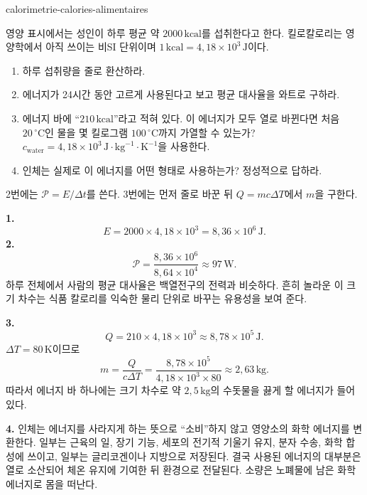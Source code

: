 \begin{exo}{calorimetrie-calories-alimentaires}

영양 표시에서는 성인이 하루 평균 약 $2000\,\text{kcal}$를 섭취한다고 한다. 킬로칼로리는 영양학에서 아직 쓰이는 비SI 단위이며 $1\,\text{kcal}=4{,}18\times10^3\,\text{J}$이다.
\begin{enumerate}
  \item 하루 섭취량을 줄로 환산하라.
  \item 에너지가 24시간 동안 고르게 사용된다고 보고 평균 대사율을 와트로 구하라.
  \item 에너지 바에 ``$210\,\text{kcal}$''라고 적혀 있다. 이 에너지가 모두 열로 바뀐다면 처음 $20\,^\circ\text{C}$인 물을 몇 킬로그램 $100\,^\circ\text{C}$까지 가열할 수 있는가? $c_{\text{water}}=4{,}18\times10^3\,\text{J}\!\cdot\!\text{kg}^{-1}\!\cdot\!\text{K}^{-1}$을 사용한다.
  \item 인체는 실제로 이 에너지를 어떤 형태로 사용하는가? 정성적으로 답하라.
\end{enumerate}
\begin{indication}
2번에는 $\mathcal P=E/\Delta t$를 쓴다. 3번에는 먼저 줄로 바꾼 뒤 $Q=mc\Delta T$에서 $m$을 구한다.
\end{indication}
\begin{solution}
\textbf{1.}
\[
E=2000\times4{,}18\times10^3=8{,}36\times10^6\,\text{J}.
\]
\textbf{2.}
\[
\mathcal P=\frac{8{,}36\times10^6}{8{,}64\times10^4}\approx97\,\text{W}.
\]
하루 전체에서 사람의 평균 대사율은 백열전구의 전력과 비슷하다. 흔히 놀라운 이 크기 차수는 식품 칼로리를 익숙한 물리 단위로 바꾸는 유용성을 보여 준다.

\textbf{3.}
\[
Q=210\times4{,}18\times10^3\approx8{,}78\times10^5\,\text{J}.
\]
$\Delta T=80\,\text{K}$이므로
\[
m=\frac{Q}{c\Delta T}
=\frac{8{,}78\times10^5}{4{,}18\times10^3\times80}
\approx2{,}63\,\text{kg}.
\]
따라서 에너지 바 하나에는 크기 차수로 약 $2{,}5\,\text{kg}$의 수돗물을 끓게 할 에너지가 들어 있다.

\textbf{4.} 인체는 에너지를 사라지게 하는 뜻으로 ``소비''하지 않고 영양소의 화학 에너지를 변환한다. 일부는 근육의 일, 장기 기능, 세포의 전기적 기울기 유지, 분자 수송, 화학 합성에 쓰이고, 일부는 글리코겐이나 지방으로 저장된다. 결국 사용된 에너지의 대부분은 열로 소산되어 체온 유지에 기여한 뒤 환경으로 전달된다. 소량은 노폐물에 남은 화학 에너지로 몸을 떠난다.
\end{solution}
\end{exo}
